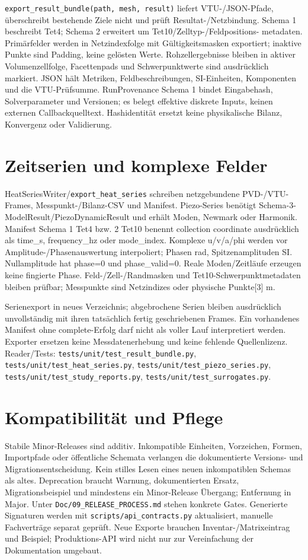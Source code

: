 \texttt{export\_result\_bundle(path, mesh, result)} liefert VTU-/JSON-Pfade,
überschreibt bestehende Ziele nicht und prüft Resultat-/Netzbindung.
Schema 1 beschreibt Tet4; Schema 2 erweitert um Tet10/Zelltyp-/Feldpositions-
metadaten. Primärfelder werden in Netzindexfolge mit Gültigkeitsmasken
exportiert; inaktive Punkte sind Padding, keine gelösten Werte.
Rohzellergebnisse bleiben in aktiver Volumenzellfolge, Facettenpads und
Schwerpunktwerte sind ausdrücklich markiert. JSON hält Metriken,
Feldbeschreibungen, SI-Einheiten, Komponenten und die VTU-Prüfsumme.
RunProvenance Schema 1 bindet Eingabehash, Solverparameter und Versionen;
es belegt effektive diskrete Inputs, keinen externen Callbackquelltext.
Hashidentität ersetzt keine physikalische Bilanz, Konvergenz oder Validierung.

\section{Zeitserien und komplexe Felder}
HeatSeriesWriter/\texttt{export\_heat\_series} schreiben netzgebundene
PVD-/VTU-Frames, Messpunkt-/Bilanz-CSV und Manifest. Piezo-Series benötigt
Schema-3-ModelResult/PiezoDynamicResult und erhält Moden, Newmark oder Harmonik.
Manifest Schema 1 Tet4 bzw. 2 Tet10 benennt collection coordinate ausdrücklich
als time\_s, frequency\_hz oder mode\_index. Komplexe u/v/a/phi werden vor
Amplitude-/Phasenauswertung interpoliert; Phasen rad, Spitzenamplituden SI.
Nullamplitude hat phase=0 und phase\_valid=0. Reale Moden/Zeitläufe erzeugen
keine fingierte Phase. Feld-/Zell-/Randmasken und Tet10-Schwerpunktmetadaten
bleiben prüfbar; Messpunkte sind Netzindizes oder physische Punkte[3] m.

Serienexport in neues Verzeichnis; abgebrochene Serien bleiben ausdrücklich
unvollständig mit ihren tatsächlich fertig geschriebenen Frames.
Ein vorhandenes Manifest ohne complete-Erfolg darf nicht als voller Lauf
interpretiert werden. Exporter ersetzen keine Messdatenerhebung und keine
fehlende Quellenlizenz. Reader/Tests:
\nolinkurl{tests/unit/test_result_bundle.py},
\nolinkurl{tests/unit/test_heat_series.py},
\nolinkurl{tests/unit/test_piezo_series.py},
\nolinkurl{tests/unit/test_study_reports.py},
\nolinkurl{tests/unit/test_surrogates.py}.

\section{Kompatibilität und Pflege}
Stabile Minor-Releases sind additiv. Inkompatible Einheiten, Vorzeichen,
Formen, Importpfade oder öffentliche Schemata verlangen die dokumentierte
Versions- und Migrationsentscheidung. Kein stilles Lesen eines neuen inkompatiblen
Schemas als altes. Deprecation braucht Warnung, dokumentierten Ersatz,
Migrationsbeispiel und mindestens ein Minor-Release Übergang; Entfernung
in Major. Unter \nolinkurl{Doc/09_RELEASE_PROCESS.md} stehen konkrete Gates.
Generierte Signaturen werden mit \nolinkurl{scripts/api_contracts.py}
aktualisiert, manuelle Fachverträge separat geprüft. Neue Exporte brauchen
Inventar-/Matrixeintrag und Beispiel; Produktions-API wird nicht nur zur
Vereinfachung der Dokumentation umgebaut.
\endgroup
